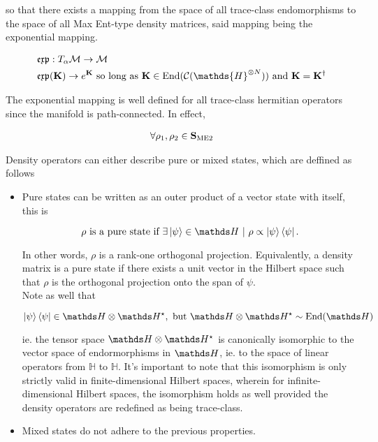\documentclass{homework}
\begin{document}
so that there exists a mapping from the space of all trace-class endomorphisms to the space of all Max Ent-type density matrices, said mapping being the exponential mapping.

\begin{align*}
    &\mathfrak{e}\mathfrak{x}\mathfrak{p}: T_{\alpha} \mathcal{M} \rightarrow \mathcal{M} \\
    &\mathfrak{e}\mathfrak{x}\mathfrak{p}({\bf K}) \rightarrow e^{{\bf K}} \textnormal{ so long as } {\bf K} \in \textnormal{End}(\mathcal{C}(\mathds{H}^{\otimes N})) \textnormal{ and } {\bf K} = {\bf K}^{\dagger}
\end{align*}

The exponential mapping is well defined for all trace-class hermitian operators since the manifold is path-connected. In effect, 


\begin{align}
    \forall \rho_1, \rho_2 \in \mathcal{\bf S}_{\textnormal{ME2}}     
\end{align}

\clearpage

Density operators can either describe pure or mixed states, which are deffined as follows 

\begin{itemize}
    \item Pure states can be written as an outer product of a vector state with itself, this is 
    
    $$
    \rho \textnormal{ is a pure state if } \exists \ket{\psi} \in \hilbert \blanky | \blanky \rho \propto \ket{\psi} \bra{\psi}. 
    $$
    
    In other words, $\rho$ is a rank-one orthogonal projection. Equivalently, a density matrix is a pure state if there exists a unit vector in the Hilbert space such that $\rho$ is the orthogonal projection onto the span of $\psi$. \\
    
    Note as well that 
    
    $$
       \ket{\psi} \bra{\psi} \in \hilbert \otimes \hilbert^{\star}, \textnormal{ but } \hilbert \otimes \hilbert^{\star} \sim \textnormal{End}(\hilbert)
    $$
    
    ie. the tensor space $\hilbert \otimes \hilbert^{\star}$ is canonically isomorphic to the vector space of endormorphisms in $\hilbert$, ie. to the space of linear operators from $\mathds{H}$ to $\mathds{H}$.
    It's important to note that this isomorphism is only strictly valid in finite-dimensional Hilbert spaces, wherein for infinite-dimensional Hilbert spaces, the isomorphism holds as well provided the density operators are redefined as being trace-class.
    \item Mixed states do not adhere to the previous properties. 
\end{itemize}
\end{document}
